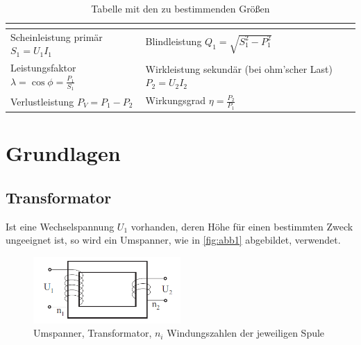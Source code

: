 \documentclass[11pt,ngerman]{scrartcl}
\begin{document}
\begin{table}[H]
	\caption{Tabelle mit den zu bestimmenden Größen}
	\label{tab:tab1}
	\begin{center}
		\begin{tabular}[c]{l|l}
			\hline
			\multicolumn{1}{c|}{\textbf{}}                         &
			\multicolumn{1}{c}{\textbf{}}                                                                                       \\
			\hline
			Scheinleistung primär $S_1 = U_1 I_1$                  & Blindleistung $Q_1 = \sqrt{S_1^2 - P_1^2}$                 \\
			Leistungsfaktor $\lambda = \cos{\phi}=\frac{P_1}{S_1}$ & Wirkleistung sekundär (bei ohm'scher Last) $P_2 = U_2 I_2$ \\
			Verlustleistung $P_V = P_1 - P_2$                      & Wirkungsgrad $\eta = \displaystyle\frac{P_2}{P_1}$         \\
			\hline
		\end{tabular}
	\end{center}
\end{table}


\newpage

\section{Grundlagen\cite{vorlagetrafo}}

\subsection{Transformator}

Ist eine Wechselspannung $U_1$ vorhanden, deren Höhe für einen bestimmten Zweck ungeeignet
ist, so wird ein Umspanner, wie in \autoref{fig:abb1} abgebildet, verwendet.

\begin{figure}[H]
	\begin{center}
		\includegraphics[width=0.5\textwidth]{abb1}
	\end{center}
	\caption{Umspanner, Transformator, $n_i$ Windungszahlen der jeweiligen Spule}
	\label{fig:abb1}
\end{figure}
\end{document}
